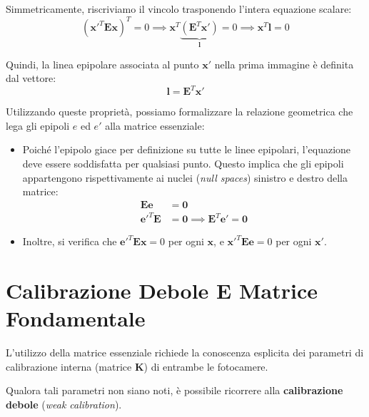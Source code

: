 ﻿\documentclass[11pt, a4paper]{article}
\begin{document}
Simmetricamente, riscriviamo il vincolo trasponendo l'intera equazione scalare:
\begin{equation}
\left( \bm{x}'^T \bm{E} \bm{x} \right)^T = 0 \implies \bm{x}^T \underbrace{\left( \bm{E}^T \bm{x}' \right)}_{\bm{l}} = 0 \implies \bm{x}^T \bm{l} = 0
\end{equation}

Quindi, la linea epipolare associata al punto $\bm{x}'$ nella prima immagine è definita dal vettore:
\begin{equation}
\bm{l} = \bm{E}^T \bm{x}'
\end{equation}

Utilizzando queste proprietà, possiamo formalizzare la relazione geometrica che lega gli epipoli $e$ ed $e'$ alla matrice essenziale:
\begin{itemize}[noitemsep]
    \item Poiché l'epipolo giace per definizione su tutte le linee epipolari, l'equazione deve essere soddisfatta per qualsiasi punto. Questo implica che gli epipoli appartengono rispettivamente ai nuclei (\emph{null spaces}) sinistro e destro della matrice:
    \begin{align}
        \bm{E} \bm{e} &= \bm{0} \\
        \bm{e}'^T \bm{E} &= \bm{0} \implies \bm{E}^T \bm{e}' = \bm{0}
    \end{align}
    \item Inoltre, si verifica che $\bm{e}'^T \bm{E} \bm{x} = 0$ per ogni $\bm{x}$, e $\bm{x}'^T \bm{E} \bm{e} = 0$ per ogni $\bm{x}'$.
\end{itemize}

\newpage

\section{Calibrazione Debole E Matrice Fondamentale}

L'utilizzo della matrice essenziale richiede la conoscenza esplicita dei parametri di calibrazione interna (matrice $\bm{K}$) di entrambe le fotocamere.



Qualora tali parametri non siano noti, è possibile ricorrere alla \textbf{calibrazione debole} (\emph{weak calibration}).
\end{document}
